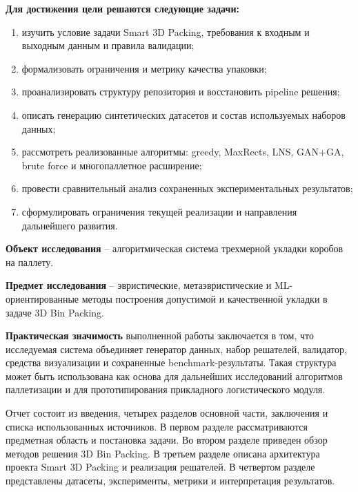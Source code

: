 \textbf{Для достижения цели решаются следующие задачи:}
\begin{enumerate}
  \item изучить условие задачи Smart 3D Packing, требования к входным и выходным данным и правила валидации;
  \item формализовать ограничения и метрику качества упаковки;
  \item проанализировать структуру репозитория и восстановить pipeline решения;
  \item описать генерацию синтетических датасетов и состав используемых наборов данных;
  \item рассмотреть реализованные алгоритмы: greedy, MaxRects, LNS, GAN+GA, brute force и многопаллетное расширение;
  \item провести сравнительный анализ сохраненных экспериментальных результатов;
  \item сформулировать ограничения текущей реализации и направления дальнейшего развития.
\end{enumerate}

\textbf{Объект исследования} -- алгоритмическая система трехмерной укладки коробов на паллету.

\textbf{Предмет исследования} -- эвристические, метаэвристические и ML-ориентированные методы построения допустимой и качественной укладки в задаче 3D Bin Packing.

\textbf{Практическая значимость} выполненной работы заключается в том, что исследуемая система объединяет генератор данных, набор решателей, валидатор, средства визуализации и сохраненные benchmark-результаты. Такая структура может быть использована как основа для дальнейших исследований алгоритмов паллетизации и для прототипирования прикладного логистического модуля.

Отчет состоит из введения, четырех разделов основной части, заключения и списка использованных источников. В первом разделе рассматриваются предметная область и постановка задачи. Во втором разделе приведен обзор методов решения 3D Bin Packing. В третьем разделе описана архитектура проекта Smart 3D Packing и реализация решателей. В четвертом разделе представлены датасеты, эксперименты, метрики и интерпретация результатов.

